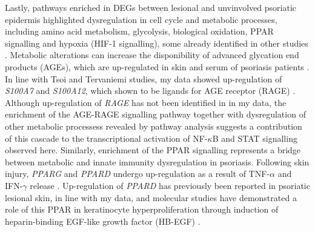Lastly, pathways enriched in DEGs between lesional and unvinvolved psoriatic epidermis highlighted dysregulation in cell cycle and metabolic processes, including amino acid metabolism, glycolysis, biological oxidation, PPAR signalling and hypoxia (HIF-1 signalling), some already identified in other studies \parencite{Coda2012, Gudjonsson2010,Aterido2016, Tervaniemi2016}. %
Metabolic alterations can increase the disponibility of advanced glycation end products (AGEs), which are up-regulated in skin and serum of psoriasis patients \parencite{Papagrigoraki2017}. In line with Tsoi and Tervaniemi studies, my data showed up-regulation of \textit{S100A7} and \textit{S100A12}, which shown to be ligands for AGE receptor (RAGE) \parencite{Eckert2004,Moser2007,Broome2003}. Although up-regulation of \textit{RAGE} has not been identified in in my data, the enrichment of the AGE-RAGE signalling pathway together with dysregulation of other metabolic processess revealed by pathway analysis suggests a contribution of this cascade to the transcriptional activation of NF-$\kappa$B and STAT signalling observed here. Similarly, enrichment of the PPAR signalling represents a bridge between metabolic and innate immunity dysregulation in psoriasis. %
Following skin injury, \textit{PPARG} and \textit{PPARD} undergo up-regulation as a result of TNF-$\alpha$ and IFN-$\gamma$ release \parencite{Tan2001}. Up-regulation of \textit{PPARD} has previously been reported in psoriatic lesional skin, in line with my data, and molecular studies have demonstrated a role of this PPAR  in keratinocyte hyperproliferation through induction of heparin-binding EGF-like growth factor (HB-EGF) \parencite{Romanowska2008}.


